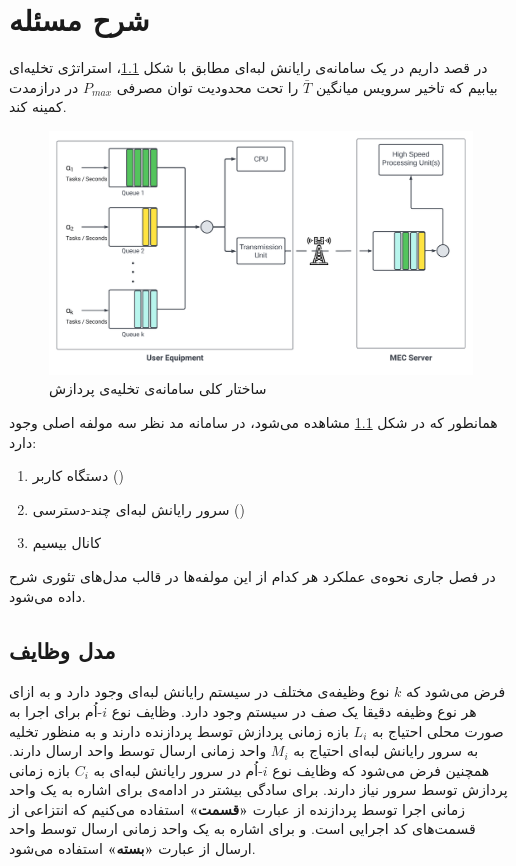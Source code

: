 \chapter{شرح مسئله}
در \CurrentProject قصد داریم در یک سامانه‌ی رایانش لبه‌ای مطابق با شکل \ref{fig-offloading-system}، استراتژی تخلیه‌ای بیابیم که تاخیر سرویس میانگین $\bar{T}$ را تحت محدودیت توان مصرفی $P_{m a x}$ در درازمدت کمینه کند.
\begin{figure}[H]
	\centering
	\includegraphics*[width=\textwidth]{figures/MEC5.png}
	\caption{ساختار کلی سامانه‌ی تخلیه‌ی پردازش}
	\label{fig-offloading-system}
\end{figure}
\newpage
همانطور که در شکل \ref{fig-offloading-system} مشاهده می‌شود، در سامانه مد نظر سه مولفه اصلی وجود دارد:
\begin{enumerate}
	\item دستگاه کاربر ()
	\item سرور رایانش لبه‌ای چند-دسترسی ()
	\item کانال بیسیم
\end{enumerate}
در فصل جاری نحوه‌ی عملکرد هر کدام از این مولفه‌ها در قالب مدل‌های تئوری شرح داده می‌شود.

\section{مدل وظایف}
فرض می‌شود که \(k\) نوع وظیفه‌ی مختلف در سیستم رایانش لبه‌ای وجود دارد و به ازای هر نوع وظیفه دقیقا یک صف در سیستم وجود دارد. وظایف نوع \(i\)-اُم برای اجرا به صورت محلی احتیاج به \(L_i\) بازه زمانی پردازش توسط پردازنده دارند و به منظور تخلیه به سرور رایانش لبه‌ای احتیاج به \(M_i\) واحد زمانی ارسال توسط واحد ارسال دارند. همچنین فرض می‌شود که وظایف نوع \(i\)-اُم در سرور رایانش لبه‌ای به \(C_i\) بازه زمانی پردازش توسط سرور نیاز دارند. برای سادگی بیشتر در ادامه‌ی \CurrentProject برای اشاره به یک واحد زمانی اجرا توسط پردازنده از عبارت \textbf{«قسمت»} استفاده می‌کنیم که انتزاعی از قسمت‌های کد اجرایی است. و برای اشاره به یک واحد زمانی ارسال توسط واحد ارسال از عبارت\textbf{ «بسته» }استفاده می‌شود.
\newpage
